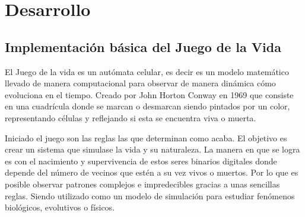 \section{Desarrollo}
\subsection{Implementación básica del Juego de la Vida}
El Juego de la vida es un autómata celular, es decir es un modelo matemático llevado de manera computacional para observar de manera dinámica cómo evoluciona en el tiempo. Creado por John Horton Conway en 1969 que consiste en una cuadrícula donde se marcan o desmarcan siendo pintados por un color, representando células y reflejando si esta se encuentra viva o muerta.


Iniciado el juego son las reglas las que determinan como acaba. El objetivo es crear un sistema que simulase la vida y su naturaleza. La manera en que se logra es con el nacimiento y supervivencia de estos seres binarios digitales donde depende del número de vecinos que estén a su vez vivos o muertos. Por lo que es posible observar patrones complejos e impredecibles gracias a unas sencillas reglas. Siendo utilizado como un modelo de simulación para estudiar fenómenos biológicos, evolutivos o físicos.

